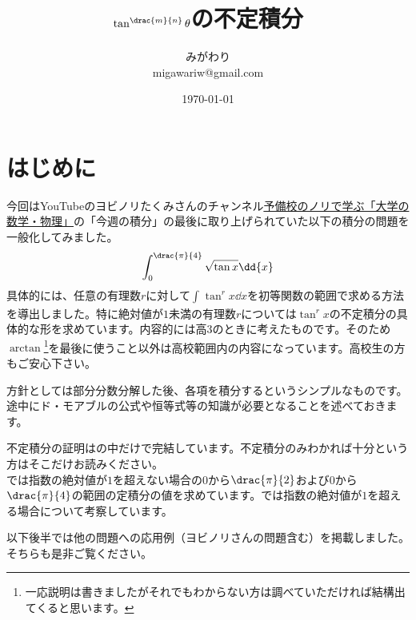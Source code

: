 \documentclass[a4j,uplatex,dvipdfmx,10pt]{jsarticle}
\title{\(\tan ^{\drac{m}{n}}\theta  \)の不定積分}
\author{みがわり\\ migawariw@gmail.com}
\date{\today}
\begin{document}
\maketitle
\tableofcontents
\section{はじめに}
\label{sec:はじめに}
今回はYouTubeのヨビノリたくみさんのチャンネル\href{https://www.google.com/url?sa=t&rct=j&q=&esrc=s&source=video&cd=&cad=rja&uact=8&ved=2ahUKEwiar7fIzpb6AhUDw4sBHU28DxMQFnoECAkQAg&url=https://www.youtube.com/channel/UCqmWJJolqAgjIdLqK3zD1QQ&usg=AOvVaw3clbmmW3q8O9-Fgp4nIJlw}{予備校のノリで学ぶ「大学の数学・物理」}の「今週の積分」の最後に取り上げられていた以下の積分の問題を一般化してみました。
\begin{equation}
\int_{0}^{\drac{\pi }{4}}\sqrt{\tan x}\dd{x}
\label{eqn:2022-09-15_19-44-54}
\end{equation}
具体的には、任意の有理数\(r \)に対して\(\int_{}^{} \tan ^{r}x \dd{x} \)を初等関数の範囲で求める方法を導出しました。特に絶対値が\(1 \)未満の有理数\(r \)については\(\tan ^r x \)の不定積分の具体的な形を求めています。内容的には高3のときに考えたものです。そのため\(\arctan  \)\footnote{一応説明は書きましたがそれでもわからない方は調べていただければ結構出てくると思います。\label{fot:2022-09-15_16-33-51}}を最後に使うこと以外は高校範囲内の内容になっています。高校生の方もご安心下さい。

方針としては部分分数分解した後、各項を積分するというシンプルなものです。途中にド・モアブルの公式や恒等式等の知識が必要となることを述べておきます。

不定積分の証明はの中だけで完結しています。不定積分のみわかれば十分という方はそこだけお読みください。\\

では指数の絶対値が\(1 \)を超えない場合の\(0 \)から\(\drac{\pi }{2} \)および\(0 \)から\(\drac{\pi }{4} \)の範囲の定積分の値を求めています。では指数の絶対値が\(1 \)を超える場合について考察しています。

以下後半では他の問題への応用例（ヨビノリさんの問題含む）を掲載しました。そちらも是非ご覧ください。
\end{document}
